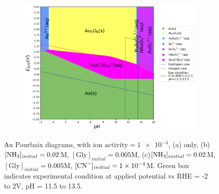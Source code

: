 \documentclass[journal=jacsat,manuscript=article]{achemso}
\begin{document}
\begin{figure}[htbp]
\begin{subfigure}[b]{0.3\textwidth}
        \par\medskip
    \end{subfigure}
    \begin{subfigure}[b]{0.3\textwidth}
        \subcaption{}\label{fig:Au_Pourbaix_NH3_Gly_CN}
        \includegraphics[width=\textwidth]{Figures/pourbaix_diagrams/Au-NH3-H2O_activity=1e-04_[NH3]=0.02M_[Gly]=0.005M_[CN]=0.0001.png}
        \par\medskip   
    \end{subfigure}
    \caption{Au Pourbaix diagrams, with $\text{ion activity}=\num{1e-4}$, (a) only, (b)$[\ce{NH3}]_{initial}= 0.02$M, $[\text{Gly}]_{initial}=0.005$M, (c)$[\ce{NH3}]_{initial}= 0.02$M, $[\text{Gly}]_{initial}=0.005$M,  $[\ce{CN-}]_{initial}=\num{1e-4}$M. Green box indicates experimental condition at applied potential vs RHE = -2 to 2V, pH = 11.5 to 13.5.}
    \label{fig:Au_Pourbaix}
\end{figure}
\end{document}
